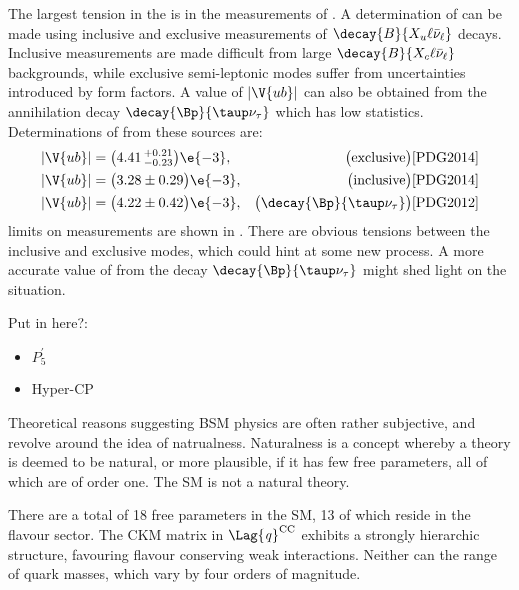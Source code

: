 The largest tension in the \ut is in  the measurements of .
A determination of  can be made using inclusive and exclusive measurements of
$\decay{B}{X_u\ell\bar\nu_\ell}$ decays.
Inclusive measurements are made difficult from large
$\decay{B}{X_c\ell\bar\nu_\ell}$ backgrounds, while exclusive semi-leptonic modes suffer from
uncertainties introduced by form factors.
A value of $\left|\V{ub}\right|$ can also be obtained from the annihilation decay
$\decay{\Bp}{\taup\nu_\tau}$ which has low statistics.
Determinations of  from these sources are:
\begin{align}
  |\V{ub}| &= \big(4.41\,^{+0.21}_{-0.23}\big)\e{-3}, & \quad\big(\mathrm{exclusive}\big)\text{\cite{PDG2014}}& \nonumber\\
  |\V{ub}| &= \big(3.28\pm{0.29}\big)\e{-3},  & \big(\mathrm{inclusive}\big)\text{\cite{PDG2014}}&\nonumber\\
  |\V{ub}| &= \big(4.22\pm{0.42}\big)\e{-3},  & \big(\decay{\Bp}{\taup\nu_\tau}\big)\text{\cite{PDG2012}}&\nonumber\\
  \label{eq:th:vub}
\end{align}
limits on \ut measurements are shown in .
There are obvious tensions between the inclusive and exclusive modes, which could hint at some new
process.
A more accurate value of  from the decay $\decay{\Bp}{\taup\nu_\tau}$ might shed light on the
situation.


Put in here?:
\begin{itemize}
  \item $P_5^\prime$
  \item Hyper-CP
\end{itemize}


Theoretical reasons suggesting BSM physics
are often rather subjective, and revolve around the idea of natrualness.
Naturalness is a concept whereby a theory is deemed to be natural, or more plausible, if it has few
free parameters, all of which are of order one.
The SM is not a natural theory.

There are a total of 18 free parameters in the SM, 13 of which reside in the flavour sector.
The CKM matrix in $\Lag{\it q}^\mathrm{CC}$ exhibits a strongly hierarchic structure, favouring
flavour conserving weak interactions.
Neither can the range of quark masses, which vary by four orders of magnitude.

